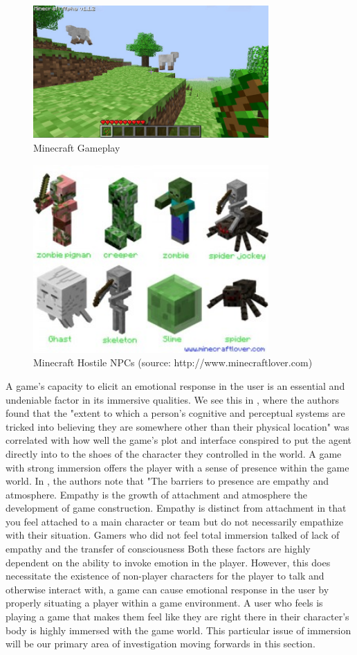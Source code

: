 \begin{figure}[ht!]
\centering
\includegraphics[width=90mm]{minecraft-32.jpg}
\caption{Minecraft Gameplay \label{overflow}}
\label{fig:Minecraft}
\end{figure}
\cite{fig:MCmonster} 
\begin{figure}[ht!]
\centering
\includegraphics[width=90mm]{minecraft-spider-300x240.jpg}
\caption{Minecraft Hostile NPCs (source: http://www.minecraftlover.com) \label{overflow}}
\label{fig:MCmonster}
\end{figure}
A game's capacity to elicit an emotional response in the user is an essential and undeniable factor in its immersive qualities. We see this in \cite{Brown04agrounded}, where the authors found that the "extent to which a person’s cognitive and
perceptual systems are tricked into believing they are
somewhere other than their physical location" \cite{Brown04agrounded}  was correlated with how well the game's plot and interface conspired to put the agent directly into to the shoes of the character they controlled in the world. A game with strong immersion offers the player with a sense of presence within the game world. In \cite{Brown04agrounded}, the authors note that "The barriers to presence are empathy and atmosphere.
Empathy is the growth of attachment and atmosphere the
development of game construction. Empathy is distinct
from attachment in that you feel attached to a main
character or team but do not necessarily empathize with
their situation. Gamers who did not feel total immersion
talked of lack of empathy and the transfer of consciousness Both these factors are highly dependent on the ability to invoke emotion in the player. However, this does necessitate the existence of non-player characters for the player to talk and otherwise interact with, a game can cause emotional response in the user by properly situating a player within a game environment. A user who feels is playing a game that makes  them feel like they are right there in their character's body is highly immersed with the game world. This particular issue of immersion will be our primary area of investigation moving forwards in this section.
